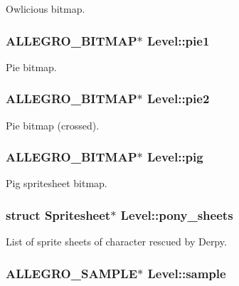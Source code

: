 \-Owlicious bitmap. \hypertarget{structLevel_acf777bae2b7533d8eda0d9766ea402df}{
\subsubsection[{pie1}]{\setlength{\rightskip}{0pt plus 5cm}\-A\-L\-L\-E\-G\-R\-O\-\_\-\-B\-I\-T\-M\-A\-P$\ast$ {\bf \-Level\-::pie1}}}\label{structLevel_acf777bae2b7533d8eda0d9766ea402df}
\-Pie bitmap. \hypertarget{structLevel_a6b817f8a028cbb01ea9d7e1e6dbcdede}{
\subsubsection[{pie2}]{\setlength{\rightskip}{0pt plus 5cm}\-A\-L\-L\-E\-G\-R\-O\-\_\-\-B\-I\-T\-M\-A\-P$\ast$ {\bf \-Level\-::pie2}}}\label{structLevel_a6b817f8a028cbb01ea9d7e1e6dbcdede}
\-Pie bitmap (crossed). \hypertarget{structLevel_aacde4816ff59c4d9ab6f403758630b8f}{
\subsubsection[{pig}]{\setlength{\rightskip}{0pt plus 5cm}\-A\-L\-L\-E\-G\-R\-O\-\_\-\-B\-I\-T\-M\-A\-P$\ast$ {\bf \-Level\-::pig}}}\label{structLevel_aacde4816ff59c4d9ab6f403758630b8f}
\-Pig spritesheet bitmap. \hypertarget{structLevel_a591b830752cc796a306e96166f736e3b}{
\subsubsection[{pony\-\_\-sheets}]{\setlength{\rightskip}{0pt plus 5cm}struct {\bf \-Spritesheet}$\ast$ {\bf \-Level\-::pony\-\_\-sheets}}}\label{structLevel_a591b830752cc796a306e96166f736e3b}
\-List of sprite sheets of character rescued by \-Derpy. \hypertarget{structLevel_a234fa7b9ec35dd360e4e3c48a944fc7d}{
\subsubsection[{sample}]{\setlength{\rightskip}{0pt plus 5cm}\-A\-L\-L\-E\-G\-R\-O\-\_\-\-S\-A\-M\-P\-L\-E$\ast$ {\bf \-Level\-::sample}}}\label{structLevel_a234fa7b9ec35dd360e4e3c48a944fc7d}
